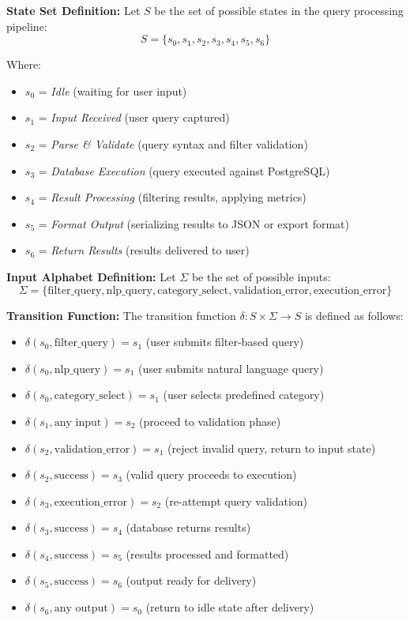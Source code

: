 \documentclass[12pt]{article}
\begin{document}
\par{\textbf{State Set Definition:}
Let $S$ be the set of possible states in the query processing pipeline:
$$S = \{s_0, s_1, s_2, s_3, s_4, s_5, s_6\}$$

Where:
\begin{itemize}
    \item $s_0$ = \textit{Idle} (waiting for user input)
    \item $s_1$ = \textit{Input Received} (user query captured)
    \item $s_2$ = \textit{Parse \& Validate} (query syntax and filter validation)
    \item $s_3$ = \textit{Database Execution} (query executed against PostgreSQL)
    \item $s_4$ = \textit{Result Processing} (filtering results, applying metrics)
    \item $s_5$ = \textit{Format Output} (serializing results to JSON or export format)
    \item $s_6$ = \textit{Return Results} (results delivered to user)
\end{itemize}
}

\par{\textbf{Input Alphabet Definition:}
Let $\Sigma$ be the set of possible inputs:
$$\Sigma = \{\text{filter\_query}, \text{nlp\_query}, \text{category\_select}, \text{validation\_error}, \text{execution\_error}\}$$
}

\par{\textbf{Transition Function:}
The transition function $\delta: S \times \Sigma \rightarrow S$ is defined as follows:

\begin{itemize}
    \item $\delta(s_0, \text{filter\_query}) = s_1$ \quad (user submits filter-based query)
    \item $\delta(s_0, \text{nlp\_query}) = s_1$ \quad (user submits natural language query)
    \item $\delta(s_0, \text{category\_select}) = s_1$ \quad (user selects predefined category)
    \item $\delta(s_1, \text{any input}) = s_2$ \quad (proceed to validation phase)
    \item $\delta(s_2, \text{validation\_error}) = s_1$ \quad (reject invalid query, return to input state)
    \item $\delta(s_2, \text{success}) = s_3$ \quad (valid query proceeds to execution)
    \item $\delta(s_3, \text{execution\_error}) = s_2$ \quad (re-attempt query validation)
    \item $\delta(s_3, \text{success}) = s_4$ \quad (database returns results)
    \item $\delta(s_4, \text{success}) = s_5$ \quad (results processed and formatted)
    \item $\delta(s_5, \text{success}) = s_6$ \quad (output ready for delivery)
    \item $\delta(s_6, \text{any output}) = s_0$ \quad (return to idle state after delivery)
\end{itemize}
}
\end{document}
